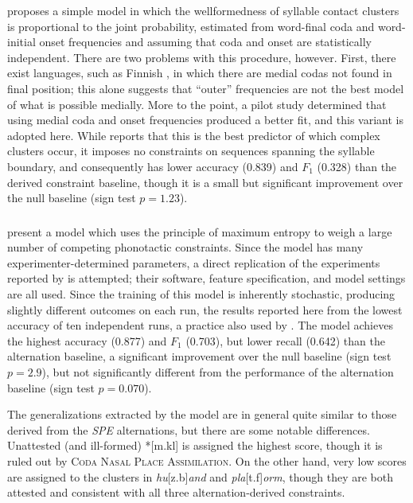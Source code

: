 \citet{Pierrehumbert1994} proposes a simple model in which the wellformedness of syllable contact clusters is proportional to the joint probability, estimated from word-final coda and word-initial onset frequencies and assuming that coda and onset are statistically independent. There are two problems with this procedure, however. First, there exist languages, such as Finnish \citep[36]{Fischer-Jorgensen1952}, in which there are medial codas not found in final position; this alone suggests that ``outer'' frequencies are not the best model of what is possible medially. More to the point, a pilot study determined that using medial coda and onset frequencies produced a better fit, and this variant is adopted here. 
While \citeauthor{Pierrehumbert1994} reports that this is the best predictor of which complex clusters occur, it imposes no constraints on sequences spanning the syllable boundary, and consequently has lower accuracy (0.839) and $F_1$ (0.328) than the derived constraint baseline, though it is a small but significant improvement over the null baseline (sign test $p = 1.23$).

\subsubsection{\citealt{Hayes2008a}}

\citet{Hayes2008a} present a model which uses the principle of maximum entropy to weigh a large number of competing phonotactic constraints. Since the model has many experimenter-determined parameters, a direct replication of the experiments reported by \citeauthor{Hayes2008a} is attempted; their software, feature specification, and model settings are all used. Since the training of this model is inherently stochastic, producing slightly different outcomes on each run, the results reported here from the lowest accuracy of ten independent runs, a practice also used by \citeauthor{Hayes2008a}. The model achieves the highest accuracy (0.877) and $F_1$ (0.703), but lower recall (0.642) than the alternation baseline, a significant improvement over the null baseline (sign test $p = 2.9$), but not significantly different from the performance of the alternation baseline (sign test $p = 0.070$). 

The generalizations extracted by the \citeauthor{Hayes2008a} model are in general quite similar to those derived from the \emph{SPE} alternations, but there are some notable differences. Unattested (and ill-formed) *[m.kl] is assigned the highest score, though it is ruled out by \textsc{Coda Nasal Place Assimilation}. On the other hand, very low scores are assigned to the clusters in \emph{hu}[z.b]\emph{and} and \emph{pla}[t.f]\emph{orm}, though they are both attested and consistent with all three alternation-derived constraints. 

